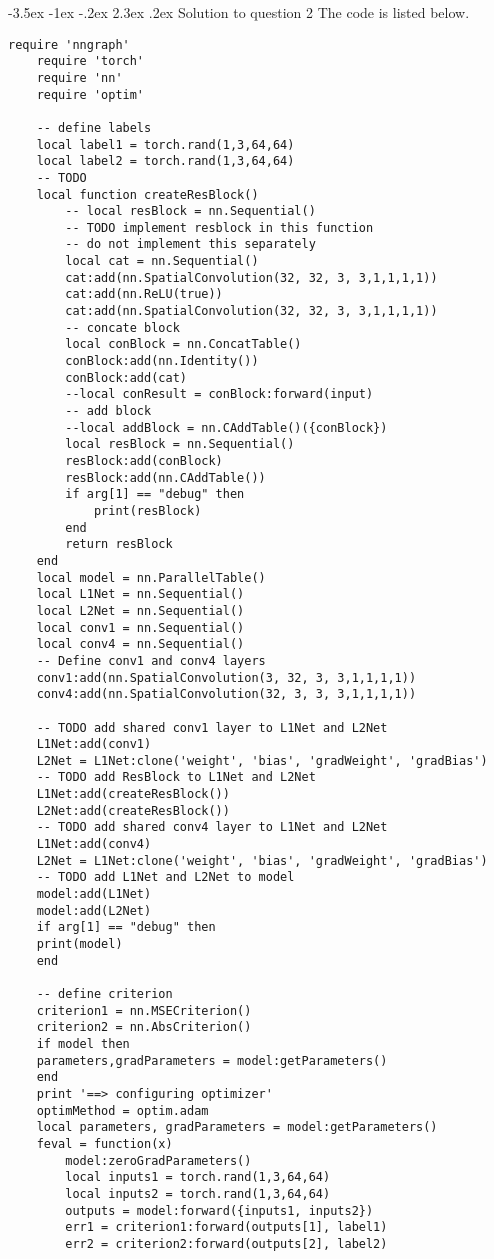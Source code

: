 \documentclass[12pt]{article}
\makeatletter
\renewcommand\section{\@startsection {section}{1}{\z@}%
	{-3.5ex \@plus -1ex \@minus -.2ex}%
	{2.3ex \@plus.2ex}%
	{\normalfont\large\bfseries}}%
\makeatother
\begin{document}
	\section{Solution to question 2}
	The code is listed below.
	\lstset{language=[5.0]Lua}
	\lstset{frame=lines}
	\lstset{basicstyle=\footnotesize\ttfamily}
	\begin{lstlisting}[breaklines=true]
	require 'nngraph'
	require 'torch'
	require 'nn'   
	require 'optim'
	
	-- define labels
	local label1 = torch.rand(1,3,64,64)
	local label2 = torch.rand(1,3,64,64)
	-- TODO
	local function createResBlock()
		-- local resBlock = nn.Sequential()
		-- TODO implement resblock in this function
		-- do not implement this separately
		local cat = nn.Sequential()
		cat:add(nn.SpatialConvolution(32, 32, 3, 3,1,1,1,1))
		cat:add(nn.ReLU(true))
		cat:add(nn.SpatialConvolution(32, 32, 3, 3,1,1,1,1))
		-- concate block
		local conBlock = nn.ConcatTable()
		conBlock:add(nn.Identity())
		conBlock:add(cat)
		--local conResult = conBlock:forward(input)
		-- add block
		--local addBlock = nn.CAddTable()({conBlock})
		local resBlock = nn.Sequential()
		resBlock:add(conBlock)
		resBlock:add(nn.CAddTable())
		if arg[1] == "debug" then
			print(resBlock)
		end
		return resBlock
	end
	local model = nn.ParallelTable()
	local L1Net = nn.Sequential()
	local L2Net = nn.Sequential()
	local conv1 = nn.Sequential()
	local conv4 = nn.Sequential()
	-- Define conv1 and conv4 layers
	conv1:add(nn.SpatialConvolution(3, 32, 3, 3,1,1,1,1))
	conv4:add(nn.SpatialConvolution(32, 3, 3, 3,1,1,1,1))
	
	-- TODO add shared conv1 layer to L1Net and L2Net
	L1Net:add(conv1)
	L2Net = L1Net:clone('weight', 'bias', 'gradWeight', 'gradBias')
	-- TODO add ResBlock to L1Net and L2Net
	L1Net:add(createResBlock())
	L2Net:add(createResBlock())
	-- TODO add shared conv4 layer to L1Net and L2Net
	L1Net:add(conv4)
	L2Net = L1Net:clone('weight', 'bias', 'gradWeight', 'gradBias')
	-- TODO add L1Net and L2Net to model
	model:add(L1Net)
	model:add(L2Net)
	if arg[1] == "debug" then
	print(model)
	end
	
	-- define criterion
	criterion1 = nn.MSECriterion()
	criterion2 = nn.AbsCriterion()
	if model then
	parameters,gradParameters = model:getParameters()
	end
	print '==> configuring optimizer'
	optimMethod = optim.adam
	local parameters, gradParameters = model:getParameters()
	feval = function(x)
		model:zeroGradParameters()
		local inputs1 = torch.rand(1,3,64,64)
		local inputs2 = torch.rand(1,3,64,64)
		outputs = model:forward({inputs1, inputs2}) 
		err1 = criterion1:forward(outputs[1], label1)
		err2 = criterion2:forward(outputs[2], label2)
	

\end{lstlisting}
\end{document}
